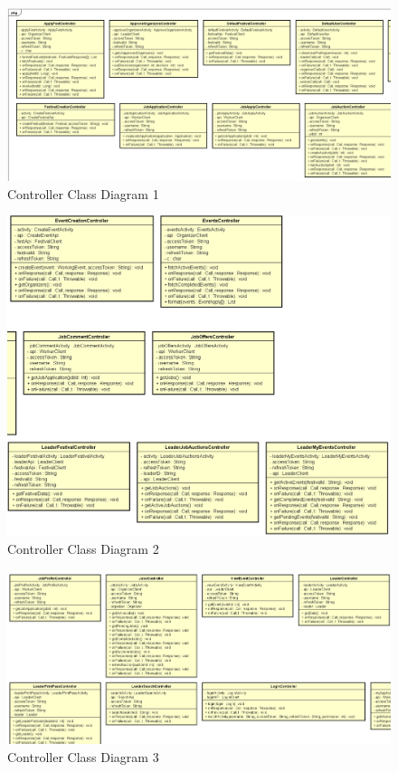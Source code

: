 \begin{figure}[H]
	\includegraphics[width=\linewidth]{diagrams/Controllers Class Diagram_part1.png}
	\caption{Controller Class Diagram 1}
	\label{fig:controller_class_diag_pt1}
\end{figure}

\begin{figure}[H]
	\includegraphics[width=\linewidth]{diagrams/Controllers Class Diagram_part2.png}
	\caption{Controller Class Diagram 2}
	\label{fig:controller_class_diag_pt2}
\end{figure}

\begin{figure}[H]
	\includegraphics[width=\linewidth]{diagrams/Controllers Class Diagram_part3.png}
	\caption{Controller Class Diagram 3}
	\label{fig:controller_class_diag_pt3}
\end{figure}

